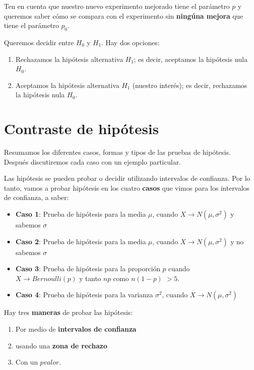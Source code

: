 \documentclass[
]{book}
\providecommand{\tightlist}{%
  \setlength{\itemsep}{0pt}\setlength{\parskip}{0pt}}
\begin{document}
Ten en cuenta que nuestro nuevo experimento mejorado tiene el parámetro \(p\) y queremos saber cómo se compara con el experimento sin \textbf{ningúna mejora} que tiene el parámetro \(p_0\).

Queremos decidir entre \(H_0\) y \(H_1\). Hay dos opciones:

\begin{enumerate}
\def\labelenumi{\arabic{enumi}.}
\item
  Rechazamos la hipótesis alternativa \(H_1\); es decir, aceptamos la hipótesis nula \(H_0\).
\item
  Aceptamos la hipótesis alternativa \(H_1\) (nuestro interés); es decir, rechazamos la hipótesis nula \(H_0\).
\end{enumerate}

\hypertarget{contraste-de-hipuxf3tesis-1}{%
\section{Contraste de hipótesis}\label{contraste-de-hipuxf3tesis-1}}

Resumamos los diferentes casos, formas y tipos de las pruebas de hipótesis. Después discutiremos cada caso con un ejemplo particular.

Las hipótesis se pueden probar o decidir utilizando intervalos de confianza. Por lo tanto, vamos a probar hipótesis en los cuatro \textbf{casos} que vimos para los intervalos de confianza, a saber:

\begin{itemize}
\item
  \textbf{Caso 1}: Prueba de hipótesis para la media \(\mu\), cuando \(X \rightarrow N(\mu, \sigma^2)\) y sabemos \(\sigma\)
\item
  \textbf{Caso 2}: Prueba de hipótesis para la media \(\mu\), cuando \(X \rightarrow N(\mu, \sigma^2)\) y no sabemos \(\sigma\)
\item
  \textbf{Caso 3}: Prueba de hipótesis para la proporción \(p\) cuando \(X \rightarrow Bernoulli(p)\) y tanto \(np\) como \(n(1-p)\) \(> 5\).
\item
  \textbf{Caso 4}: Prueba de hipótesis para la varianza \(\sigma^2\), cuando \(X \rightarrow N(\mu, \sigma^2)\)
\end{itemize}

Hay tres \textbf{maneras} de probar las hipótesis:

\begin{enumerate}
\def\labelenumi{\arabic{enumi}.}
\tightlist
\item
  Por medio de \textbf{intervalos de confianza}
\item
  usando una \textbf{zona de rechazo}
\item
  Con un \(pvalor\).
\end{enumerate}
\end{document}
